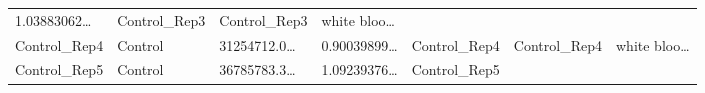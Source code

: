 \documentclass[
]{article}
\begin{document}
\begin{longtable}[]{@{}lllllll@{}}
\begin{minipage}[t]{0.13\columnwidth}
1.03883062\ldots{}\strut
\end{minipage} & \begin{minipage}[t]{0.12\columnwidth}\raggedright
Control\_Rep3\strut
\end{minipage} & \begin{minipage}[t]{0.12\columnwidth}\raggedright
Control\_Rep3\strut
\end{minipage} & \begin{minipage}[t]{0.13\columnwidth}\raggedright
white bloo\ldots{}\strut
\end{minipage}\tabularnewline
\begin{minipage}[t]{0.12\columnwidth}\raggedright
Control\_Rep4\strut
\end{minipage} & \begin{minipage}[t]{0.07\columnwidth}\raggedright
Control\strut
\end{minipage} & \begin{minipage}[t]{0.13\columnwidth}\raggedright
31254712.0\ldots{}\strut
\end{minipage} & \begin{minipage}[t]{0.13\columnwidth}\raggedright
0.90039899\ldots{}\strut
\end{minipage} & \begin{minipage}[t]{0.12\columnwidth}\raggedright
Control\_Rep4\strut
\end{minipage} & \begin{minipage}[t]{0.12\columnwidth}\raggedright
Control\_Rep4\strut
\end{minipage} & \begin{minipage}[t]{0.13\columnwidth}\raggedright
white bloo\ldots{}\strut
\end{minipage}\tabularnewline
\begin{minipage}[t]{0.12\columnwidth}\raggedright
Control\_Rep5\strut
\end{minipage} & \begin{minipage}[t]{0.07\columnwidth}\raggedright
Control\strut
\end{minipage} & \begin{minipage}[t]{0.13\columnwidth}\raggedright
36785783.3\ldots{}\strut
\end{minipage} & \begin{minipage}[t]{0.13\columnwidth}\raggedright
1.09239376\ldots{}\strut
\end{minipage} & \begin{minipage}[t]{0.12\columnwidth}\raggedright
Control\_Rep5\strut
\end{minipage} & \begin{minipage}[t]{0.12\columnwidth}\raggedright

\end{minipage}
\end{longtable}
\end{document}
